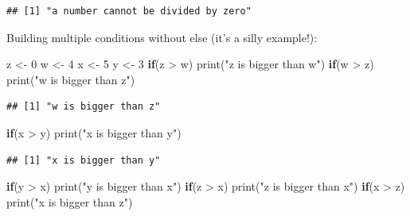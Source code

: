 \documentclass[
]{book}
\newenvironment{Shaded}{\begin{snugshade}}{\end{snugshade}}
\newcommand{\ControlFlowTok}[1]{\textcolor[rgb]{0.13,0.29,0.53}{\textbf{#1}}}
\newcommand{\DecValTok}[1]{\textcolor[rgb]{0.00,0.00,0.81}{#1}}
\newcommand{\FunctionTok}[1]{\textcolor[rgb]{0.00,0.00,0.00}{#1}}
\newcommand{\NormalTok}[1]{#1}
\newcommand{\OtherTok}[1]{\textcolor[rgb]{0.56,0.35,0.01}{#1}}
\newcommand{\SpecialCharTok}[1]{\textcolor[rgb]{0.00,0.00,0.00}{#1}}
\newcommand{\StringTok}[1]{\textcolor[rgb]{0.31,0.60,0.02}{#1}}
\begin{document}
\begin{verbatim}
## [1] "a number cannot be divided by zero"
\end{verbatim}

Building multiple conditions without else (it's a silly example!):

\begin{Shaded}
\begin{Highlighting}[]
\NormalTok{z }\OtherTok{\textless{}{-}} \DecValTok{0}
\NormalTok{w }\OtherTok{\textless{}{-}} \DecValTok{4}
\NormalTok{x }\OtherTok{\textless{}{-}} \DecValTok{5}
\NormalTok{y }\OtherTok{\textless{}{-}} \DecValTok{3}
\ControlFlowTok{if}\NormalTok{(z }\SpecialCharTok{\textgreater{}}\NormalTok{ w) }\FunctionTok{print}\NormalTok{(}\StringTok{"z is bigger than w"}\NormalTok{)}
\ControlFlowTok{if}\NormalTok{(w }\SpecialCharTok{\textgreater{}}\NormalTok{ z) }\FunctionTok{print}\NormalTok{(}\StringTok{"w is bigger than z"}\NormalTok{)}
\end{Highlighting}
\end{Shaded}

\begin{verbatim}
## [1] "w is bigger than z"
\end{verbatim}

\begin{Shaded}
\begin{Highlighting}[]
\ControlFlowTok{if}\NormalTok{(x }\SpecialCharTok{\textgreater{}}\NormalTok{ y) }\FunctionTok{print}\NormalTok{(}\StringTok{"x is bigger than y"}\NormalTok{)}
\end{Highlighting}
\end{Shaded}

\begin{verbatim}
## [1] "x is bigger than y"
\end{verbatim}

\begin{Shaded}
\begin{Highlighting}[]
\ControlFlowTok{if}\NormalTok{(y }\SpecialCharTok{\textgreater{}}\NormalTok{ x) }\FunctionTok{print}\NormalTok{(}\StringTok{"y is bigger than x"}\NormalTok{)}
\ControlFlowTok{if}\NormalTok{(z }\SpecialCharTok{\textgreater{}}\NormalTok{ x) }\FunctionTok{print}\NormalTok{(}\StringTok{"z is bigger than x"}\NormalTok{)}
\ControlFlowTok{if}\NormalTok{(x }\SpecialCharTok{\textgreater{}}\NormalTok{ z) }\FunctionTok{print}\NormalTok{(}\StringTok{"x is bigger than z"}\NormalTok{)}
\end{Highlighting}
\end{Shaded}
\end{document}
